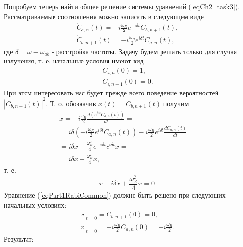 Попробуем теперь найти общее решение системы уравнений
(\ref{eqCh2_task3}). Рассматриваемые соотношения можно записать в
следующем виде
\begin{eqnarray}
  {\dot C}_{a,n}\left(t\right) = -i \frac{\omega_R}{2} e^{-i \delta t} 
C_{b, n + 1}\left(t\right),
\nonumber \\
{\dot C}_{b, n + 1}\left(t\right) = -i \frac{\omega_R}{2} e^{i \delta t} 
C_{a, n}\left(t\right),
  \nonumber
\end{eqnarray}
где $\delta = \omega - \omega_{ab}$ - расстройка частоты.
Задачу будем решать только для случая излучения, т. е. начальные
условия имеют вид
\begin{eqnarray}
  C_{a,n}\left(0\right) = 1,
  \nonumber \\
  C_{b,n+1}\left(0\right) = 0.
  \nonumber
\end{eqnarray}
При этом интересовать нас будет прежде всего поведение вероятностей
$\left|C_{b, n + 1}\left(t\right)\right|^2$. Т. о.
обозначив $x\left(t\right) = C_{b,n+1}\left(t\right)$ получим
\begin{eqnarray}
  \ddot{x} =  -i \frac{\omega_R}{2} \frac{d \left(e^{i \delta t} 
    C_{a, n}\left(t\right)\right) }{d t} =
  \nonumber \\
  = i \delta \left(- i \frac{\omega_R}{2} e^{ i\delta t} 
  C_{a, n}\left(t\right) \right) -i \frac{\omega_R}{2} e^{i \delta t}
  \frac{d C_{a, n}\left(t\right)}{dt} =
  \nonumber \\
  = i \delta \dot{x} - \frac{\omega_R^2}{4} e^{-i \delta t} e^{i \delta t} x =
  \nonumber \\
  = i \delta \dot{x} - \frac{\omega_R^2}{4} x,
  \nonumber
\end{eqnarray}
т. е.
\begin{equation}
  \ddot{x} - i \delta \dot{x} + \frac{\omega_R^2}{4} x = 0.
  \label{eqPart1RabiCommon}
\end{equation}
Уравнение (\ref{eqPart1RabiCommon}) должно быть решено при следующих
начальных условиях:
\begin{eqnarray}
  \left.x\right|_{t=0} = C_{b,n+1}\left(0\right) = 0,
  \nonumber \\
  \left.\dot{x}\right|_{t=0} = -i \frac{\omega_R}{2} C_{a,n}\left(0\right) =
  -i \frac{\omega_R}{2}.
  \nonumber
\end{eqnarray}
Результат:
